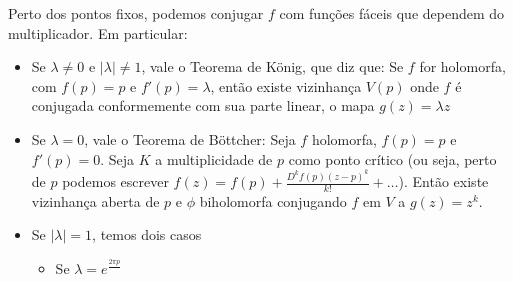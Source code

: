 \documentclass{article}
\begin{document}
Perto dos pontos fixos, podemos conjugar $f$ com funções fáceis que dependem do multiplicador. Em particular:
\begin{itemize}
    \item Se $\lambda \neq 0$ e $|\lambda| \neq 1$, vale o Teorema de König, que diz que: Se $f$ for holomorfa, com $f(p) = p$ e $f'(p) = \lambda$, então existe vizinhança $V(p)$ onde $f$ é conjugada conformemente com sua parte linear, o mapa $g(z) = \lambda z$
    \item Se $\lambda = 0$, vale o Teorema de Böttcher: Seja $f$ holomorfa, $f(p) = p$ e $f'(p) = 0$. Seja $K$ a multiplicidade de $p$ como ponto crítico (ou seja, perto de $p$ podemos escrever $f(z) = f(p) + \frac{D^kf(p)(z - p)^k}{k!} + \dots$). Então existe vizinhança aberta de $p$ e $\phi$ biholomorfa conjugando $f$ em $V$ a $g(z) = z^k$.
    \item Se $|\lambda| = 1$, temos dois casos
    \begin{itemize}
        \item Se $\lambda = e^{\frac{2\pi p}{}}$  
    \end{itemize}
\end{itemize}
\end{document}
